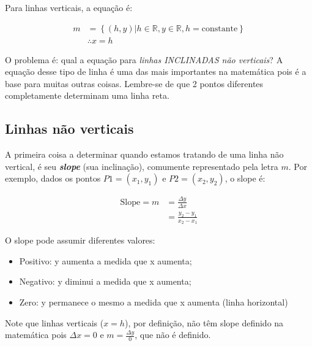 \documentclass[pdftex, brazil, 12pt, twoside]{article}
\begin{document}
Para linhas verticais, a equação é:

\begin{equation}
  \begin{split}
               m & = \left\{(h, y) | h \in \mathbb{R}, y \in \mathbb{R}, h = \text{constante}\right\}\\
                 & \therefore x = h
  \end{split}
\end{equation}

O problema é: qual a equação para \emph{linhas INCLINADAS não verticais}? A equação desse tipo de linha é uma
das mais importantes na matemática pois é a base para muitas outras coisas. Lembre-se
de que 2 pontos diferentes completamente determinam uma linha reta.

\subsection{Linhas não verticais}
\label{modelagem-linear-linhas-nao-verticais}

A primeira coisa a determinar quando estamos tratando de uma linha não vertical,
é seu \textbf{\emph{slope}} (sua inclinação), comumente representado pela letra $m$. Por
exemplo, dados os pontos $P1 = (x_1, y_1)$ e $P2 = (x_2, y_2)$, o slope é:

\begin{equation}
  \begin{split}
    \text{Slope} = m & = \frac{\Delta y}{\Delta x}\\
                     & = \frac{y_2 - y_1}{x_2 - x_1}
  \end{split}
\end{equation}

O slope pode assumir diferentes valores:

\begin{itemize}[noitemsep]
\item Positivo: y aumenta a medida que x aumenta;
\item Negativo: y diminui a medida que x aumenta;
\item Zero: y permanece o mesmo a medida que x aumenta (linha horizontal)
\end{itemize}

Note que linhas verticais ($x = h$), por definição, não têm slope definido na matemática pois
$\Delta x = 0$ e $m = \frac{\Delta y}{0}$, que não é definido.
\end{document}
